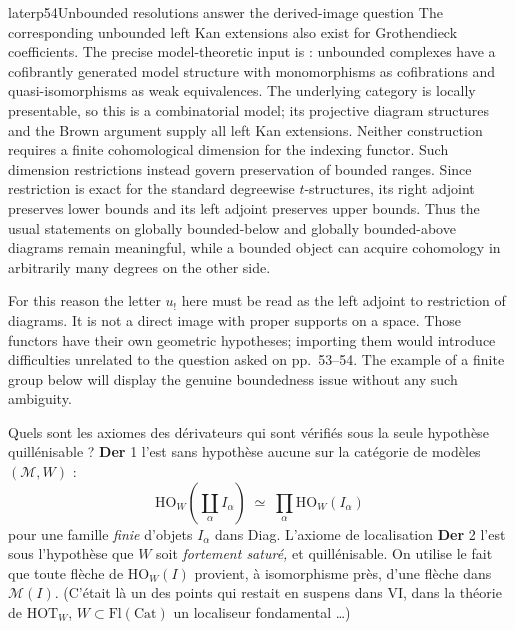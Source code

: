\begin{dcomment}{later}{p54}{Unbounded resolutions answer the derived-image question}
The corresponding unbounded left Kan extensions also exist for Grothendieck coefficients. The precise model-theoretic input is \citet[Proposition 3.13]{Beke2000}: unbounded complexes have a cofibrantly generated model structure with monomorphisms as cofibrations and quasi-isomorphisms as weak equivalences. The underlying category is locally presentable, so this is a combinatorial model; its projective diagram structures and the Brown argument supply all left Kan extensions. Neither construction requires a finite cohomological dimension for the indexing functor. Such dimension restrictions instead govern preservation of bounded ranges. Since restriction is exact for the standard degreewise $t$-structures, its right adjoint preserves lower bounds and its left adjoint preserves upper bounds. Thus the usual statements on globally bounded-below and globally bounded-above diagrams remain meaningful, while a bounded object can acquire cohomology in arbitrarily many degrees on the other side.

For this reason the letter $u_!$ here must be read as the left adjoint to restriction of diagrams. It is not a direct image with proper supports on a space. Those functors have their own geometric hypotheses; importing them would introduce difficulties unrelated to the question asked on pp.~53--54. The example of a finite group below will display the genuine boundedness issue without any such ambiguity.
\end{dcomment}


Quels sont les axiomes des dérivateurs qui sont vérifiés sous la seule hypothèse quillénisable ? \textbf{Der} 1 l'est sans hypothèse aucune sur la catégorie de modèles $(\mathcal{M},W)$ :
\[ \mathrm{HO}_{W}(\coprod_{\alpha} I_{\alpha}) \;\simeq\; \prod_{\alpha} \mathrm{HO}_{W}(I_{\alpha}) \]
pour une famille \textit{finie} d'objets $I_{\alpha}$ dans Diag. L'axiome de localisation \textbf{Der} 2 l'est sous l'hypothèse que $W$ soit \textit{fortement saturé,} et quillénisable. On utilise le fait que toute flèche de $\mathrm{HO}_{W}(I)$ provient, à isomorphisme près, d'une flèche dans $\mathcal{M}(I)$. (C'était là un des points qui restait en suspens dans VI, dans la théorie de $\mathrm{HOT}_{W}$, $W \subset \mathrm{Fl}(\mathrm{Cat})$ un localiseur fondamental \dots)


